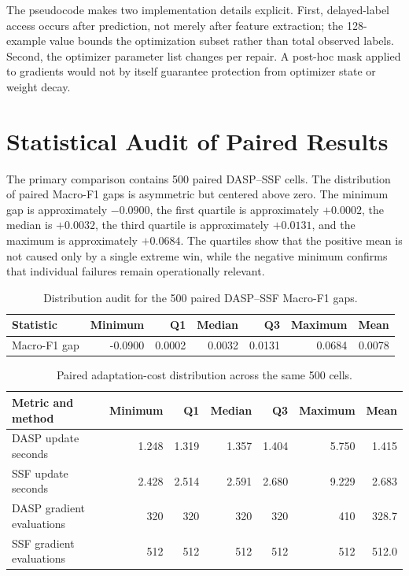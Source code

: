 The pseudocode makes two implementation details explicit. First, delayed-label access occurs after prediction, not merely after feature extraction; the 128-example value bounds the optimization subset rather than total observed labels. Second, the optimizer parameter list changes per repair. A post-hoc mask applied to gradients would not by itself guarantee protection from optimizer state or weight decay.

\section{Statistical Audit of Paired Results}
\label{app:statistical-audit}

The primary comparison contains 500 paired DASP--SSF cells. The distribution of paired Macro-F1 gaps is asymmetric but centered above zero. The minimum gap is approximately $-0.0900$, the first quartile is approximately $+0.0002$, the median is $+0.0032$, the third quartile is approximately $+0.0131$, and the maximum is approximately $+0.0684$. The quartiles show that the positive mean is not caused only by a single extreme win, while the negative minimum confirms that individual failures remain operationally relevant.

\begin{table}[t]
\caption{Distribution audit for the 500 paired DASP--SSF Macro-F1 gaps.}
\label{tab:gap-quantiles}
\centering
\begin{tabular}{lrrrrrr}
\toprule
Statistic & Minimum & Q1 & Median & Q3 & Maximum & Mean\\
\midrule
Macro-F1 gap & -0.0900 & 0.0002 & 0.0032 & 0.0131 & 0.0684 & 0.0078\\
\bottomrule
\end{tabular}
\end{table}

\begin{table}[t]
\caption{Paired adaptation-cost distribution across the same 500 cells.}
\label{tab:cost-quantiles}
\centering
\begin{tabular}{lrrrrrr}
\toprule
Metric and method & Minimum & Q1 & Median & Q3 & Maximum & Mean\\
\midrule
DASP update seconds & 1.248 & 1.319 & 1.357 & 1.404 & 5.750 & 1.415\\
SSF update seconds & 2.428 & 2.514 & 2.591 & 2.680 & 9.229 & 2.683\\
DASP gradient evaluations & 320 & 320 & 320 & 320 & 410 & 328.7\\
SSF gradient evaluations & 512 & 512 & 512 & 512 & 512 & 512.0\\
\bottomrule
\end{tabular}
\end{table}

